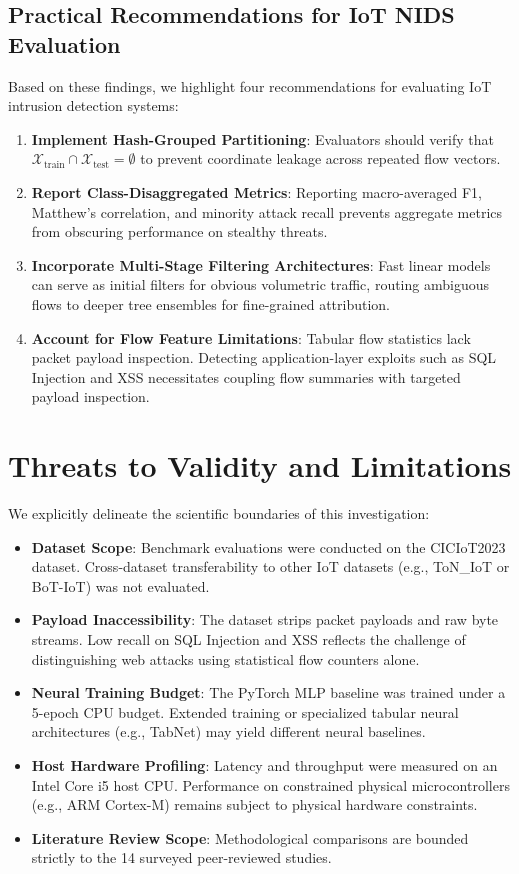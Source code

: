 \documentclass[conference,10pt,twocolumn]{IEEEtran}
\begin{document}
\subsection{Practical Recommendations for IoT NIDS Evaluation}
Based on these findings, we highlight four recommendations for evaluating IoT intrusion detection systems:
\begin{enumerate}
    \item \textbf{Implement Hash-Grouped Partitioning}: Evaluators should verify that $\mathcal{X}_{\text{train}} \cap \mathcal{X}_{\text{test}} = \emptyset$ to prevent coordinate leakage across repeated flow vectors.
    \item \textbf{Report Class-Disaggregated Metrics}: Reporting macro-averaged F1, Matthew's correlation, and minority attack recall prevents aggregate metrics from obscuring performance on stealthy threats.
    \item \textbf{Incorporate Multi-Stage Filtering Architectures}: Fast linear models can serve as initial filters for obvious volumetric traffic, routing ambiguous flows to deeper tree ensembles for fine-grained attribution.
    \item \textbf{Account for Flow Feature Limitations}: Tabular flow statistics lack packet payload inspection. Detecting application-layer exploits such as SQL Injection and XSS necessitates coupling flow summaries with targeted payload inspection.
\end{enumerate}

\section{Threats to Validity and Limitations}
\label{sec:threats}

We explicitly delineate the scientific boundaries of this investigation:
\begin{itemize}
    \item \textbf{Dataset Scope}: Benchmark evaluations were conducted on the CICIoT2023 dataset. Cross-dataset transferability to other IoT datasets (e.g., ToN\_IoT or BoT-IoT) was not evaluated.
    \item \textbf{Payload Inaccessibility}: The dataset strips packet payloads and raw byte streams. Low recall on SQL Injection and XSS reflects the challenge of distinguishing web attacks using statistical flow counters alone.
    \item \textbf{Neural Training Budget}: The PyTorch MLP baseline was trained under a 5-epoch CPU budget. Extended training or specialized tabular neural architectures (e.g., TabNet) may yield different neural baselines.
    \item \textbf{Host Hardware Profiling}: Latency and throughput were measured on an Intel Core i5 host CPU. Performance on constrained physical microcontrollers (e.g., ARM Cortex-M) remains subject to physical hardware constraints.
    \item \textbf{Literature Review Scope}: Methodological comparisons are bounded strictly to the 14 surveyed peer-reviewed studies.
\end{itemize}
\end{document}
